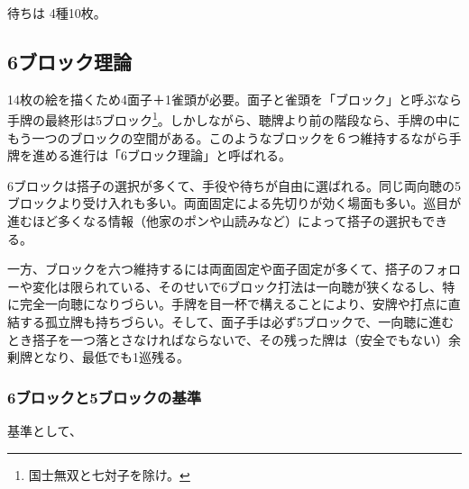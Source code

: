 \documentclass[../nankiru_main.tex]{subfiles}
\begin{document}

待ちは  4種10枚。


\subsection{6ブロック理論} \label{subsec:6block}

14枚の絵を描くため4面子＋1雀頭が必要。面子と雀頭を「ブロック」と呼ぶなら手牌の最終形は5ブロック\footnote{国士無双と七対子を除け。}。しかしながら、聴牌より前の階段なら、手牌の中にもう一つのブロックの空間がある。このようなブロックを６つ維持するながら手牌を進める進行は「6ブロック理論」と呼ばれる\citep[][p. 16]{uzaku-haikouritsu}。

6ブロックは搭子の選択が多くて、手役や待ちが自由に選ばれる。同じ両向聴の5ブロックより受け入れも多い。両面固定による先切りが効く場面も多い\citep[][p. 17]{uzaku-haikouritsu}。巡目が進むほど多くなる情報（他家のポンや山読みなど）によって搭子の選択もできる\citep{yuusee-6block-1, yuusee-6block-2}。

一方、ブロックを六つ維持するには両面固定や面子固定が多くて、搭子のフォローや変化は限られている、そのせいで6ブロック打法は一向聴が狭くなるし、特に完全一向聴になりづらい。手牌を目一杯で構えることにより、安牌や打点に直結する孤立牌も持ちづらい。そして、面子手は必ず5ブロックで、一向聴に進むとき搭子を一つ落とさなければならないで、その残った牌は（安全でもない）余剰牌となり、最低でも1巡残る。

%

\subsubsection{6ブロックと5ブロックの基準}

基準として、
\end{document}
